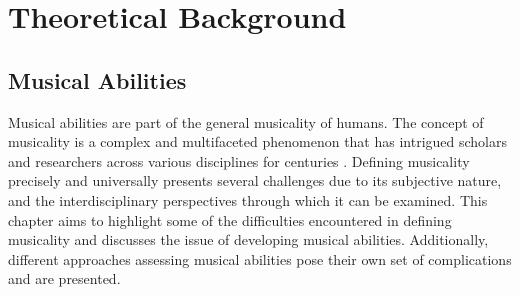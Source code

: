 \chapter{Theoretical Background}
\label{cap:Background}

\section{Musical Abilities}
Musical abilities are part of the general musicality of humans. The concept of musicality is a complex and multifaceted phenomenon that has intrigued scholars and researchers across various disciplines for centuries \cite{Gembris1987, Pausch2022, Roman-Caballero2018}. Defining musicality precisely and universally presents several challenges due to its subjective nature, and the interdisciplinary perspectives through which it can be examined.  This chapter aims to highlight some of the difficulties encountered in defining musicality and discusses the issue of developing musical abilities. Additionally, different approaches assessing musical abilities pose their own set of complications and are presented.

